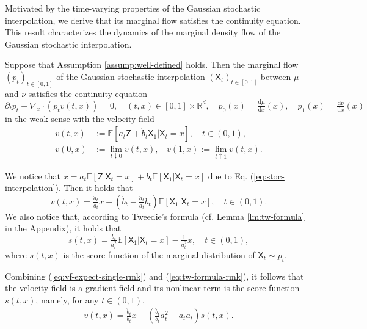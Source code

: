 \documentclass[twoside,11pt]{article}
\def\sR{{\mathbb{R}}}
\newcommand{\E}{\mathbb{E}}
\def\paref#1{(\ref{#1})}
\newcommand{\diff}{\mathrm{d}}
\numberwithin{equation}{section}
\begin{document}
Motivated by the time-varying properties of the Gaussian stochastic interpolation, we derive that its marginal flow satisfies the continuity equation. This result characterizes the dynamics of the marginal density flow of the Gaussian stochastic interpolation.

\begin{theorem} \label{thm:flow-gif}
Suppose that Assumption \ref{assump:well-defined} holds.
Then the marginal flow $(p_t)_{t \in [0, 1]}$ of the Gaussian stochastic interpolation $(\mathsf{X}_t)_{t \in [0, 1]}$ between $\mu$ and $\nu$ satisfies the continuity equation
\begin{equation}
    \label{eq:cont-eq}
    \partial_t p_t + \nabla_x \cdot (p_t v(t, x)) = 0, \quad (t, x) \in [0, 1] \times \sR^d, \quad p_0(x) = \tfrac{\diff \mu}{\diff x}(x), \quad p_1(x) = \tfrac{\diff \nu}{\diff x}(x)
\end{equation}
in the weak sense with the velocity field
\begin{align}
    v(t, x) &:= \E[ \dot{a}_t \mathsf{Z} + \dot{b}_t \mathsf{X}_1 | \mathsf{X}_t = x], \quad t \in (0, 1), \label{eq:vf-expect} \\
    v(0, x) &:= \lim_{t \downarrow 0} v(t, x), ~~~~ v(1, x) := \lim_{t \uparrow 1} v(t, x) \label{eq:vf-boundary}.
\end{align}
\end{theorem}


\begin{remark}
We notice that $x = a_t \E[\mathsf{Z} | \mathsf{X}_t = x] + b_t \E[\mathsf{X}_1 | \mathsf{X}_t = x]$ due to Eq. \paref{eq:stoc-interpolation}.
Then it holds that
\begin{equation}
    \label{eq:vf-expect-single-rmk}
    v(t, x) = \tfrac{\dot{a}_t}{a_t} x + \left( \dot{b}_t - \tfrac{\dot{a}_t}{a_t}b_t \right) \E[\mathsf{X}_1 | \mathsf{X}_t = x], \quad t \in (0, 1).
\end{equation}
We also notice that, according to Tweedie's formula (cf. Lemma \ref{lm:tw-formula} in the Appendix), it holds that
\begin{equation}
    \label{eq:tw-formula-rmk}
    s(t, x) = \tfrac{b_t}{a_t^2} \E \left[ \mathsf{X}_1 | \mathsf{X}_t = x \right] - \tfrac{1}{a_t^2} x, \quad t \in (0, 1),
\end{equation}
where $s(t, x)$ is the score function of the marginal distribution of $\mathsf{X}_t \sim p_t$.

Combining \paref{eq:vf-expect-single-rmk} and \paref{eq:tw-formula-rmk}, it follows that the velocity field is a gradient field and its nonlinear term is the score function $s(t, x)$, namely, for any $t \in (0, 1)$,
\begin{align}
    \label{eq:gene-vf-interpolation-rmk}
    v(t, x) = \tfrac{\dot{b}_t}{b_t} x + \left( \tfrac{\dot{b}_t}{b_t} a_t^2 - \dot{a}_t a_t \right) s(t, x).
\end{align}
\end{remark}
\end{document}
